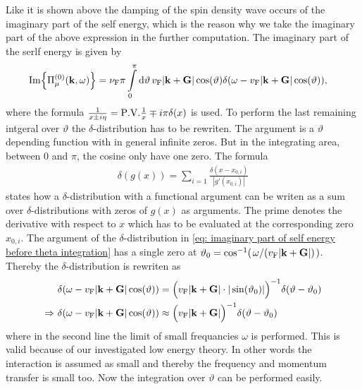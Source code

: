 Like it is shown above the damping of the spin density wave occurs of the imaginary part of the self energy, which is the reason why we take the imaginary part of the above expression in the further computation.
The imaginary part of the serlf energy is given by
%
\begin{align}
	\Im{\Pi_{\mu}^{(0)}(\vb{k}, \omega)} &= 
		\nu_{\mathrm{F}} \pi
		\int\limits_{0}^{\pi} \dd{\vartheta}
		v_{\mathrm{F}} |\vb{k}+\vb{G}| \cos(\vartheta) \delta(\omega - v_{\mathrm{F}} |\vb{k} + \vb{G}| \cos(\vartheta)),
	\label{eq: imaginary part of self energy before theta integration}
\end{align}
%
where the formula $\frac{1}{x \pm i\eta} = \PV{\frac{1}{x}} \mp i \pi \delta(x)$ is used.
To perform the last remaining intgeral over $\vartheta$ the $\delta$-distribution has to be rewriten.
The argument is a $\vartheta$ depending function with in general infinite zeros.
But in the integrating area, between $0$ and $\pi$, the cosine only have one zero.
The formula
%
\begin{align}
	\delta(g(x)) = \sum\limits_{i=1} \frac{\delta(x-x_{0,i})}{|g'(x_{0,i})|}
\end{align}
%
states how a $\delta$-distribution with a functional argument can be writen as a sum over $\delta$-distributions with zeros of $g(x)$ as arguments.
The prime denotes the derivative with respect to $x$ which has to be evaluated at the corresponding zero $x_{0,i}$.
The argument of the $\delta$-distribution in \eqref{eq: imaginary part of self energy before theta integration} has a single zero at $\vartheta_{0} = \cos[-1](\flatfrac{\omega}{(v_{\mt{F}} |\vb{k} + \vb{G}|)})$.
Thereby the $\delta$-distribution is rewriten as
%
\begin{align}
	&\delta(\omega - v_{\mathrm{F}} |\vb{k} + \vb{G}| \cos(\vartheta)) = \Big(v_{\mathrm{F}} |\vb{k} + \vb{G}| \cdot |\sin(\vartheta_{0})|\Big)^{-1} \delta(\vartheta - \vartheta_{0})
	\notag \\
	\Rightarrow\ &\delta(\omega - v_{\mathrm{F}} |\vb{k} + \vb{G}| \cos(\vartheta)) \approx \Big(v_{\mathrm{F}} |\vb{k} + \vb{G}|\Big)^{-1} \delta(\vartheta - \vartheta_{0})
\end{align}
%
where in the second line the limit of small frequancies $\omega$ is performed.
This is valid because of our investigated low energy theory.
In other words the interaction is assumed as small and thereby the frequency and momentum transfer is small too.
Now the integration over $\vartheta$ can be performed easily.
